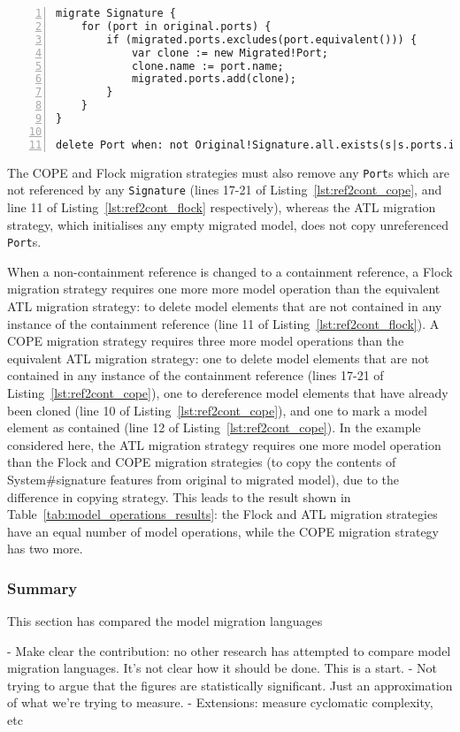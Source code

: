 \begin{lstlisting}[basicstyle=\ttfamily\footnotesize, flexiblecolumns=true, numbers=left, nolol=true, caption=Change R to C model migration in Flock, label=lst:ref2cont_flock, language=Flock, tabsize=2]
migrate Signature {
	for (port in original.ports) {
		if (migrated.ports.excludes(port.equivalent())) {
			var clone := new Migrated!Port;
			clone.name := port.name;
			migrated.ports.add(clone);
		}
	}
}

delete Port when: not Original!Signature.all.exists(s|s.ports.includes(original))
\end{lstlisting}


The COPE and Flock migration strategies must also remove any \texttt{Port}s which are not referenced by any \texttt{Signature} (lines 17-21 of Listing~\ref{lst:ref2cont_cope}, and line 11 of Listing~\ref{lst:ref2cont_flock} respectively), whereas the ATL migration strategy, which initialises any empty migrated model, does not copy unreferenced \texttt{Port}s.

When a non-containment reference is changed to a containment reference, a Flock migration strategy requires one more more model operation than the equivalent ATL migration strategy: to delete model elements that are not contained in any instance of the containment reference (line 11 of Listing~\ref{lst:ref2cont_flock}). A COPE migration strategy requires three more model operations than the equivalent ATL migration strategy: one to delete model elements that are not contained in any instance of the containment reference (lines 17-21 of Listing~\ref{lst:ref2cont_cope}), one to dereference model elements that have already been cloned (line 10 of Listing~\ref{lst:ref2cont_cope}), and one to mark a model element as contained (line 12 of Listing~\ref{lst:ref2cont_cope}).  In the example considered here, the ATL migration strategy requires one more model operation than the Flock and COPE migration strategies (to copy the contents of System\#signature features from original to migrated model), due to the difference in copying strategy. This leads to the result shown in Table~\ref{tab:model_operations_results}: the Flock and ATL migration strategies have an equal number of model operations, while the COPE migration strategy has two more.


\subsubsection{Summary}
This section has compared the model migration languages

- Make clear the contribution: no other research has attempted to compare model migration languages. It's not clear how it should be done. This is a start. 
- Not trying to argue that the figures are statistically significant. Just an approximation of what we're trying to measure.
- Extensions: measure cyclomatic complexity, etc
